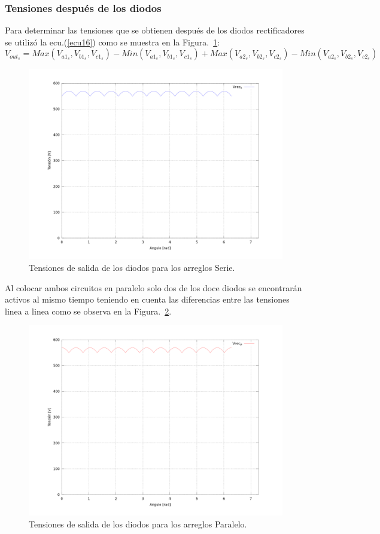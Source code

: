 \documentclass[12pt,graphicx,caption,rotating]{article}
\begin{document}
\subsubsection{Tensiones después de los diodos}
\noindent
Para determinar las tensiones que se obtienen después de los diodos rectificadores se utilizó la ecu.(\ref{ecu16}) como se muestra en la Figura.~\ref{fig3}:
\begin{equation}
 V_{out_s} = Max (V_{a1_s}, V_{b1_s}, V_{c1_s})- Min (V_{a1_s}, V_{b1_s}, V_{c1_s}) + Max (V_{a2_s}, V_{b2_s}, V_{c2_s})- Min (V_{a2_s}, V_{b2_s}, V_{c2_s}) 
\label{ecu16}
\end{equation}
\begin{figure}[H]
	\centering
		\includegraphics[scale=0.3]{ten_rec_s.png}
	\caption{Tensiones de salida de los diodos para los arreglos Serie.}
	\label{fig3}
\end{figure}
\noindent
Al colocar ambos circuitos en paralelo solo dos de los doce diodos se encontrarán activos al mismo tiempo teniendo en cuenta las diferencias entre las tensiones linea a linea como se observa en la Figura.~\ref{fig4}.
\begin{figure}[H]
	\centering
		\includegraphics[scale=0.3]{ten_rec_p.png}
	\caption{Tensiones de salida de los diodos para los arreglos Paralelo.}
	\label{fig4}
\end{figure}
\end{document}

